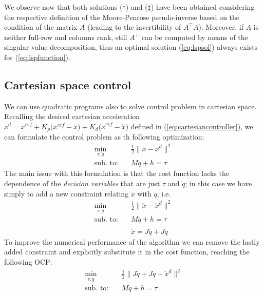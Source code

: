 	We observe now that both solutions ($\dagger$) and ($\ddagger$) have been obtained considering the respective definition of the Moore-Penrose pseudo-inverse based on the condition of the matrix $A$ (leading to the invertibility of $A^\top A$). Moreover, if $A$ is neither full-row and columns rank, still $A^+$ can be computed by means of the singular value decomposition, thus an optimal solution (\ref{eq:lspsol}) always exists for (\ref{eq:lspfunction}).
	
\subsection{Cartesian space control}
	We can use quadratic programs also to solve control problem in cartesian space. Recalling the desired cartesian acceleration $\ddot x^d = \ddot x^{ref} + K_p\big(x^{ref}-x\big) + K_d\big(\dot x^{ref} - \dot x\big)$ defined in (\ref{eq:cartesiancontroller}), we can formulate the control problem as th following optimization:
	\begin{align*}
		\min_{\tau, \ddot q} \quad & \frac12 \big\|\ddot x - \ddot x^d\|^2 \\
		\textrm{sub. to:} \quad & M\ddot q + h = \tau
	\end{align*}
	The main issue with this formulation is that the cost function lacks the dependence of the \textit{decision variables} that are just $\tau$ and $\ddot q$; in this case we have simply to add a new constraint relating $\ddot x$ with $\ddot q$, i.e. 
	\begin{equation}
	\begin{aligned}
		\min_{\tau, \ddot q} \quad & \frac12 \big\|\ddot x - \ddot x^d\|^2 \\
		\textrm{sub. to:} \quad & M\ddot q + h = \tau \\
		& \ddot x = J\ddot q + \dot J \dot q
	\end{aligned}
	\end{equation}
	To improve the numerical performance of the algorithm we can remove the lastly added constraint and explicitly substitute it in the cost function, reaching the following OCP:
	\begin{equation} \label{eq:qpcartesian}
		\begin{aligned}
			\min_{\tau, \ddot q} \quad & \frac12 \big\| J\ddot q + \dot J\dot q - \ddot x^d\|^2 \\
			\textrm{sub. to:} \quad & M\ddot q + h = \tau
		\end{aligned}
	\end{equation}
	

